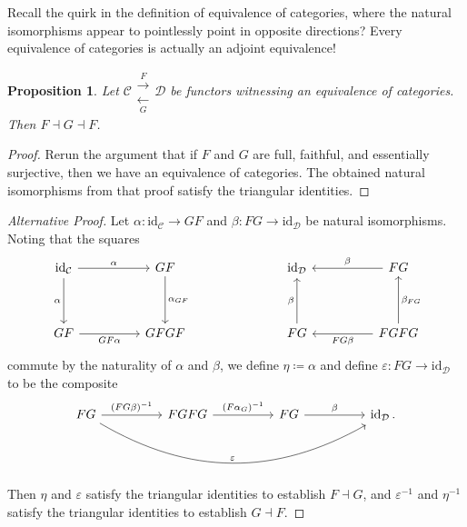 \documentclass[a4paper,11pt]{article}
\theoremstyle{break_italics}
\newtheorem*{proposition*}{Proposition}
\theoremstyle{break_upright}
\theoremstyle{remark}
\newcommand{\id}{\mathrm{id}}
\newcommand{\C}{\mathcal{C}}
\newcommand{\D}{\mathcal{D}}
\begin{document}
Recall the quirk in the definition of equivalence of categories, where the natural isomorphisms appear to pointlessly point in opposite directions? Every equivalence of categories is actually an adjoint equivalence!

\begin{proposition*}
	Let $\C \substack{\xrightarrow{F} \\ \xleftarrow[G]{}} \D$ be functors witnessing an equivalence of categories. Then $F \dashv G \dashv F$.
\end{proposition*}
\begin{proof}
	Rerun the argument that if $F$ and $G$ are full, faithful, and essentially surjective, then we have an equivalence of categories. The obtained natural isomorphisms from that proof satisfy the triangular identities.
\end{proof}

\begin{proof}[Alternative Proof]
	Let $\alpha \colon \id_\C \to GF$ and $\beta \colon FG \to \id_\D$ be natural isomorphisms. Noting that the squares
	\[
\begin{tikzcd}
\id_\C \arrow[rr, "\alpha"] \arrow[dd, "\alpha"'] &  & GF \arrow[dd, "\alpha_{GF}"] &  &  & \id_\D                 &  & FG \arrow[ll, "\beta"']                              \\
                                                  &  &                              &  &  &                        &  &                                                      \\
GF \arrow[rr, "GF\alpha"']                        &  & GFGF                         &  &  & FG \arrow[uu, "\beta"] &  & FGFG \arrow[uu, "\beta_{FG}"'] \arrow[ll, "FG\beta"]
\end{tikzcd}
	\]
	commute by the naturality of $\alpha$ and $\beta$, we define $\eta \coloneqq \alpha$ and define $\varepsilon \colon FG \to \id_\D$ to be the composite
	\[
\begin{tikzcd}
FG \arrow[rr, "(FG\beta)^{-1}"] \arrow[rrrrrr, "\varepsilon", bend right] &  & FGFG \arrow[rr, "(F\alpha_G)^{-1}"] &  & FG \arrow[rr, "\beta"] &  & {\id_\D\,.}
\end{tikzcd}
	\]
	Then $\eta$ and $\varepsilon$ satisfy the triangular identities to establish $F \dashv G$, and $\varepsilon^{-1}$ and $\eta^{-1}$ satisfy the triangular identities to establish $G \dashv F$.
\end{proof}
\end{document}
